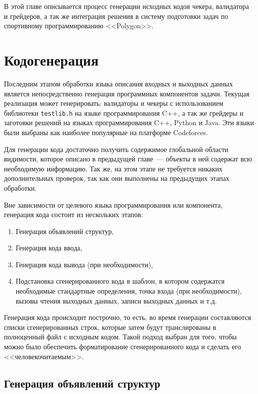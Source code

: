 \documentclass[times,specification,annotation]{style/itmo-student-thesis/itmo-student-thesis}
\begin{document}
В этой главе описывается процесс генерации исходных кодов чекера, валидатора и грейдеров, а так же интеграция решения в систему подготовки задач по спортивному программированию <<Polygon>>.

\section{Кодогенерация}

Последним этапом обработки языка описания входных и выходных данных является непосредственно генерация программных компонентов задачи. Текущая реализация может генерировать: валидаторы и чекеры с использованием библиотеки \texttt{testlib.h} на языке программирования C++, а так же грейдеры и заготовки решений на языках программирования C++, Python и Java. Эти языки были выбраны как наиболее популярные на платформе Codeforces.

Для генерации кода достаточно получить содержимое глобальной области видимости, которое описано в предыдущей главе~--- объекты в ней содержат всю необходимую информацию. Так же, на этом этапе не требуется никаких дополнительных проверок, так как они выполнены на предыдущих этапах обработки.

Вне зависимости от целевого языка программирования или компонента, генерация кода состоит из нескольких этапов:

\begin{enumerate}
    \item Генерация объявлений структур,
    \item Генерация кода ввода,
    \item Генерация кода вывода (при необходимости),
    \item Подстановка сгенерированного кода в шаблон, в котором содержатся необходимые стандартные определения, точка входа (при необходимости), вызовы чтения выходных данных, записи выходных данных и т.д.
\end{enumerate}

Генерация кода происходит построчно, то есть, во время генерации составляются списки сгенерированных строк, которые затем будут транслированы в полноценный файл с исходным кодом. Такой подход выбран для того, чтобы можно было обеспечить форматирование сгенерированного кода и сделать его <<человекочитаемым>>.

\subsection{Генерация объявлений структур}
\end{document}
